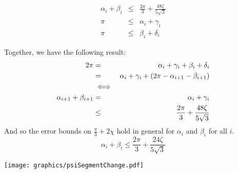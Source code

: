 $$
\begin{array}{rcl}
\alpha_i +\beta_i &\leq& \frac{2 \pi}{3} + \frac{48 \zeta}{5\sqrt3}\\
\pi &\leq& \alpha_i + \gamma_i \\
\pi &\leq& \beta_i + \delta_i
\end{array}
$$

Together, we have the following result:
\begin{eqnarray*}
2\pi &=& \alpha_i + \gamma_i + \beta_i + \delta_i\\
 &=& \alpha_i + \gamma_i + \left( 2\pi - \alpha_{i+1} - \beta_{i+1} \right)\\
 &\iff&\\
\alpha_{i+1} + \beta_{i+1}&=&\alpha_i + \gamma_i \\
&\leq& \frac{2\pi}{3} + \frac{48\zeta}{5\sqrt{3}}\\
\end{eqnarray*}
And so the error bounds on $\frac{\pi}{3}+2\chi$ hold in general for $\alpha_i$ and $\beta_i$ for all $i$.  
$$\alpha_i + \beta_i \leq \frac{2\pi}{3} + \frac{24\zeta}{5\sqrt{3}}$$

\begin{minipage}{\linewidth}
\begin{center}
\texttt{[image: graphics/psiSegmentChange.pdf]}
\label{fig:psiSegmentChange.pdf}
\end{center}
\end{minipage}

